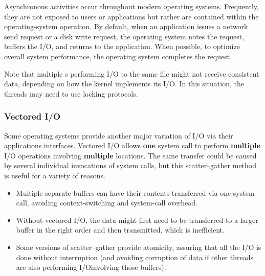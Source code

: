 Asynchronous activities occur throughout modern operating systems.
Frequently, they are not exposed to users or applications but rather are contained within the operating-system operation.
By default, when an application issues a network send request or a disk write request, the operating system notes the request, buffers the I/O, and returns to the application.
When possible, to optimize overall system performance, the operating system completes the request.

Note that multiple s performing I/O to the same file might not receive consistent data, depending on how the kernel implements its I/O.
In this situation, the threads may need to use locking protocols.

\subsubsection{Vectored I/O}\label{subsubsec:Vectored_IO}
Some operating systems provide another major variation of I/O via their applications interfaces.
Vectored I/O allows \textbf{one} system call to perform \textbf{multiple} I/O operations involving \textbf{multiple} locations.
The same transfer could be caused by several individual invocations of system calls, but this scatter–gather method is useful for a variety of reasons.
\begin{itemize}[noitemsep]
\item Multiple separate buffers can have their contents transferred via one system call, avoiding context-switching and system-call overhead.
\item Without vectored I/O, the data might first need to be transferred to a larger buffer in the right order and then transmitted, which is inefficient.
\item Some versions of scatter–gather provide atomicity, assuring that all the I/O is done without interruption (and avoiding corruption of data if other threads are also performing I/Oinvolving those buffers).
\end{itemize}


